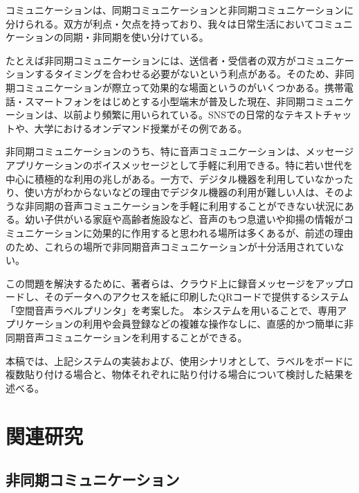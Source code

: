 \documentclass[submit,techrep,noauthor]{ipsj}
\def\|{\verb|}
\begin{document}
コミュニケーションは、同期コミュニケーションと非同期コミュニケーションに分けられる。双方が利点・欠点を持っており、我々は日常生活においてコミュニケーションの同期・非同期を使い分けている。\par
たとえば非同期コミュニケーションには、送信者・受信者の双方がコミュニケーションするタイミングを合わせる必要がないという利点がある。そのため、非同期コミュニケーションが際立って効果的な場面というのがいくつかある。携帯電話・スマートフォンをはじめとする小型端末が普及した現在、非同期コミュニケーションは、以前より頻繁に用いられている。SNSでの日常的なテキストチャットや、大学におけるオンデマンド授業がその例である。\par
非同期コミュニケーションのうち、特に音声コミュニケーションは、メッセージアプリケーションのボイスメッセージとして手軽に利用できる。特に若い世代を中心に積極的な利用の兆しがある。一方で、デジタル機器を利用していなかったり、使い方がわからないなどの理由でデジタル機器の利用が難しい人は、そのような非同期の音声コミュニケーションを手軽に利用することができない状況にある。幼い子供がいる家庭や高齢者施設など、音声のもつ息遣いや抑揚の情報がコミュニケーションに効果的に作用すると思われる場所は多くあるが、前述の理由のため、これらの場所で非同期音声コミュニケーションが十分活用されていない。\par
この問題を解決するために、著者らは、クラウド上に録音メッセージをアップロードし、そのデータへのアクセスを紙に印刷したQRコードで提供するシステム「空間音声ラベルプリンタ」を考案した。
本システムを用いることで、専用アプリケーションの利用や会員登録などの複雑な操作なしに、直感的かつ簡単に非同期音声コミュニケーションを利用することができる。\par
本稿では、上記システムの実装および、使用シナリオとして、ラベルをボードに複数貼り付ける場合と、物体それぞれに貼り付ける場合について検討した結果を述べる。

%2
\section{関連研究}


% 2.1
\subsection{非同期コミュニケーション}

% 情報処理学会論文誌ジャーナルの\LaTeX スタイルファイルを含む論文執筆キットは
% \begin{quote}
% \small
% \|http://www.ipsj.or.jp/jip/submit/style.html|
\end{document}
